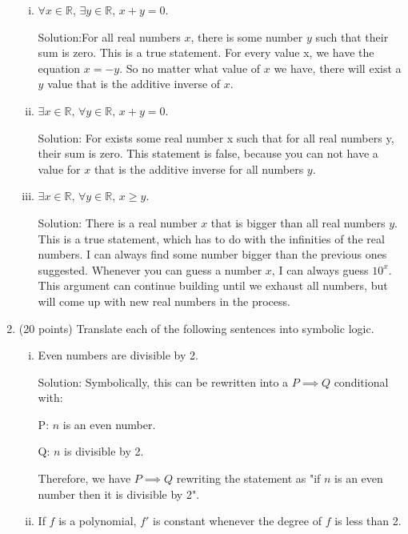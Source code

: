 \documentclass[11pt]{amsart}
\begin{document}
\begin{enumerate}
\begin{enumerate}[(i)]
\item $\forall x\in\mathbb{R},\,\exists y\in\mathbb{R},\,x+y=0$.

Solution:For all real numbers $x$, there is some number $y$ such that their sum is zero. This is a true statement. For every value x, we have the equation $x = -y$. So no matter what value of $x$ we have, there will exist a $y$ value that is the additive inverse of $x$.


\item $\exists x\in\mathbb{R},\,\forall y\in\mathbb{R},\,x+y=0$.

Solution: For exists some real number x such that for all real numbers y, their sum is zero. This statement is false, because you can not have a value for $x$ that is the additive inverse for all numbers $y$. 


\item $\exists x\in\mathbb{R},\,\forall y\in\mathbb{R},\,x\geq y$.

Solution: There is a real number $x$ that is bigger than all real numbers $y$. This is a true statement, which has to do with the infinities of the real numbers. I can always find some number bigger than the previous ones suggested. Whenever you can guess a number $x$, I can always guess $10^x$. This argument can continue building until we exhaust all numbers, but will come up with new real numbers in the process.


\end{enumerate}


\vspace{.2in}

\item (20 points) Translate each of the following sentences into symbolic logic. 
\begin{enumerate}[(i)]
\item Even numbers are divisible by 2.

Solution: Symbolically, this can be rewritten into a $ P \implies Q $ conditional with:

P: $n$ is an even number.

Q: $n$ is divisible by 2.

Therefore, we have $ P \implies Q $ rewriting the statement as "if $n$ is an even number then it is divisible by 2".


\item If $f$ is a polynomial, $f'$ is constant whenever the degree of $f$ is less than 2.


\end{enumerate}
\end{enumerate}
\end{document}
